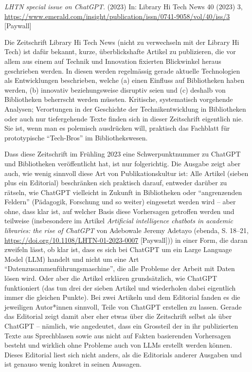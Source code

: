 \documentclass[a4paper,
fontsize=11pt,
oneside,
numbers=noperiodatend,
parskip=half-,
bibliography=totoc,
final
]{scrartcl}
\begin{document}
\emph{LHTN special issue on ChatGPT}. (2023) In: Library Hi Tech News 40
(2023) 3,
\url{https://www.emerald.com/insight/publication/issn/0741-9058/vol/40/iss/3}
{[}Paywall{]}

Die Zeitschrift Library Hi Tech News (nicht zu verwechseln mit der
Library Hi Tech) ist dafür bekannt, kurze, überblickshafte Artikel zu
publizieren, die vor allem aus einem auf Technik und Innovation
fixierten Blickwinkel heraus geschrieben werden. In diesen werden
regelmässig gerade aktuelle Technologien als Entwicklungen beschrieben,
welche (a) einen Einfluss auf Bibliotheken haben werden, (b) innovativ
beziehungsweise disruptiv seien und (c) deshalb von Bibliotheken
beherrscht werden müssten. Kritische, systematisch vorgehende Analysen;
Verortungen in der Geschichte der Technikentwicklung in Bibliotheken
oder auch nur tiefergehende Texte finden sich in dieser Zeitschrift
eigentlich nie. Sie ist, wenn man es polemisch ausdrücken will,
praktisch das Fachblatt für prototypische \enquote{Tech-Bros} im
Bibliothekswesen.

Dass diese Zeitschrift im Frühling 2023 eine Schwerpunktnummer zu
ChatGPT und Bibliotheken veröffentlicht hat, ist nur folgerichtig. Die
Ausgabe zeigt aber auch, wie wenig sinnvoll diese Art von
Publikationskultur ist: Alle Artikel (sieben plus ein Editorial)
beschränken sich praktisch darauf, entweder darüber zu rätseln, wie
ChatGPT vielleicht in Zukunft in Bibliotheken oder \enquote{angrenzenden
Feldern} (Pädagogik, Forschung und so weiter) eingesetzt werden wird --
aber ohne, dass klar ist, auf welcher Basis diese Vorhersagen getroffen
werden und teilweise (insbesondere im Artikel \emph{Artificial
intelligence chatbots in academic libraries: the rise of ChatGPT} von
Adebowale Jeremy Adetayo (ebenda, S. 18--21,
\url{https://doi.org/10.1108/LHTN-01-2023-0007} {[}Paywall{]})) in einer
Form, die daran zweifeln lässt, ob klar ist, dass es sich bei ChatGPT um
ein Large Language Model (LLM) handelt und nicht um eine Art
\enquote{Datenzusammenführungsmaschine}, die alle Probleme der Arbeit
mit Daten lösen wird. Oder aber die Artikel erklären grundsätzlich, wie
ChatGPT funktioniert (das tun drei der sieben Artikel und wiederholen
dabei eigentlich immer die gleichen Punkte). Bei zwei Artikeln und dem
Editorial fanden es die jeweiligen Autor*innen sinnvoll, Teile von
ChatGPT erstellen zu lassen. Gerade das Editorial zeigt damit aber eher
etwas über die Zeitschrift selbst als über ChatGPT -- nämlich, wie
angedeutet, dass ein Grossteil der in ihr publizierten Texte aus
Sprechblasen sowie aus nicht auf Fakten basierenden Vorhersagen besteht
und wirklich ohne Probleme auch von LLMs erstellt werden können. Dieses
Editorial liest sich nicht anders, als die Editorials anderer Ausgaben
und ist genauso wenig konkret in seinen Aussagen.
\end{document}
